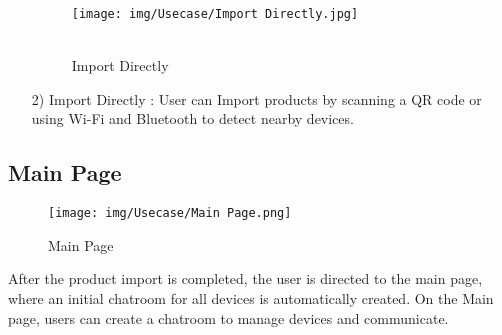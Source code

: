 \documentclass[conference]{IEEEtran}
\begin{document}
\begin{enumerate}
\begin{figure}[h]
\hspace{1.5cm}
\centering
\begin{minipage}{0.4\columnwidth}
    \texttt{[image: img/Usecase/Import Directly.jpg]}
    \caption{\\ Import Directly}
\end{minipage}
\end{figure}
    \item [2)] Import Directly : User can Import products by scanning a QR code or using Wi-Fi and Bluetooth to detect nearby devices.
\end{enumerate}

\subsection{Main Page}
\begin{figure}[h]
\hspace{1.5cm}
\centering
\begin{minipage}{0.4\columnwidth}
    \texttt{[image: img/Usecase/Main Page.png]}
    \caption{Main Page}
\end{minipage}
\end{figure}
After the product import is completed, the user is directed to the main page, where an initial chatroom for all devices is automatically created. On the Main page, users can create a chatroom to manage devices and communicate. 

\clearpage
\end{document}
